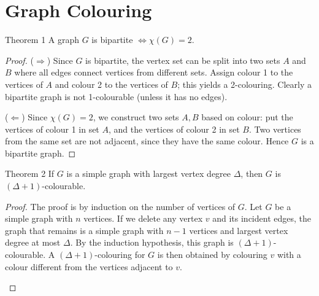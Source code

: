 \section{Graph Colouring}

\begin{thmbox}{Theorem 1}
A graph $G$ is bipartite $\iff \chi(G) = 2$.
\end{thmbox}

\begin{proof}
($\Rightarrow$) Since $G$ is bipartite, the vertex set can be split into two sets $A$ and $B$ where all edges connect vertices from different sets. Assign colour 1 to the vertices of $A$ and colour 2 to the vertices of $B$; this yields a 2-colouring. Clearly a bipartite graph is not 1-colourable (unless it has no edges).

\medskip
($\Leftarrow$) Since $\chi(G) = 2$, we construct two sets $A, B$ based on colour: put the vertices of colour 1 in set $A$, and the vertices of colour 2 in set $B$. Two vertices from the same set are not adjacent, since they have the same colour. Hence $G$ is a bipartite graph.
\end{proof}

\begin{thmbox}{Theorem 2}
If $G$ is a simple graph with largest vertex degree $\Delta$, then $G$ is $(\Delta+1)$-colourable.
\end{thmbox}

\begin{proof}
The proof is by induction on the number of vertices of $G$. Let $G$ be a simple graph with $n$ vertices. If we delete any vertex $v$ and its incident edges, the graph that remains is a simple graph with $n-1$ vertices and largest vertex degree at most $\Delta$. By the induction hypothesis, this graph is $(\Delta+1)$-colourable. A $(\Delta+1)$-colouring for $G$ is then obtained by colouring $v$ with a colour different from the vertices adjacent to $v$.

\begin{center}
\end{center}
\end{proof}

